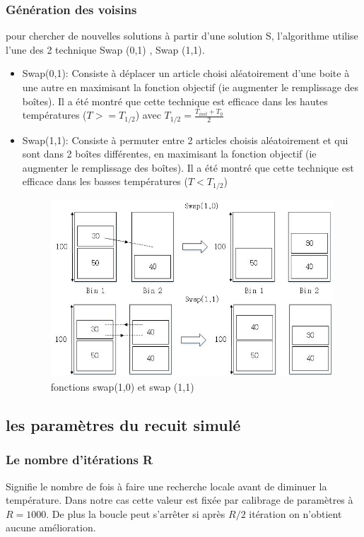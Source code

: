 \documentclass[12pt]{article}
\begin{document}
\subsubsection{Génération des voisins}
pour chercher de nouvelles solutions à partir d’une solution S, l’algorithme utilise l’une des 2 technique Swap (0,1) , Swap (1,1). 
\begin{itemize}
    \item Swap(0,1): Consiste à déplacer un article choisi aléatoirement d’une boite à une autre 
    en maximisant la fonction objectif (ie augmenter le remplissage des boîtes). 
    Il a été montré que cette technique est efficace dans les hautes températures ($T>=T_{1/2}$) avec $ T_{1/2} = \frac{T_{init}+T_{0}}{2}$ 
    \item Swap(1,1): Consiste à permuter entre 2 articles choisis aléatoirement et qui sont dans 2 boîtes différentes, en maximisant la fonction objectif (ie augmenter le remplissage des boîtes).
     Il a été montré que cette technique est efficace dans les basses températures ($T<T_{1/2}$)
\begin{figure}[H]
    \includegraphics[width=\linewidth]{../figures/RS_SWAP.png}
    \caption{fonctions swap(1,0) et swap (1,1)}
    \label{fig:swap}
\end{figure}
\end{itemize}
\subsection{les paramètres du recuit simulé }
\subsubsection{Le nombre d'itérations R}
Signifie le nombre de fois à faire une recherche locale avant de diminuer la température. Dans notre cas cette valeur est fixée par calibrage de paramètres à $R = 1000$.
 De plus la boucle peut s’arrêter si après $R/2$ itération on n'obtient aucune amélioration.
\end{document}
